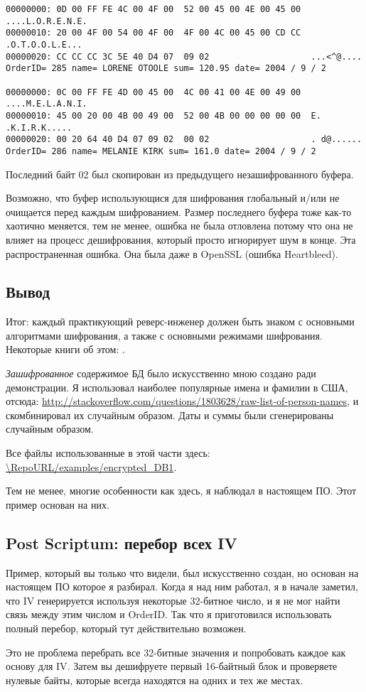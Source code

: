 \begin{lstlisting}
00000000: 0D 00 FF FE 4C 00 4F 00  52 00 45 00 4E 00 45 00  ....L.O.R.E.N.E.
00000010: 20 00 4F 00 54 00 4F 00  4F 00 4C 00 45 00 CD CC   .O.T.O.O.L.E...
00000020: CC CC CC 3C 5E 40 D4 07  09 02                    ...<^@....
OrderID= 285 name= LORENE OTOOLE sum= 120.95 date= 2004 / 9 / 2

00000000: 0C 00 FF FE 4D 00 45 00  4C 00 41 00 4E 00 49 00  ....M.E.L.A.N.I.
00000010: 45 00 20 00 4B 00 49 00  52 00 4B 00 00 00 00 00  E. .K.I.R.K.....
00000020: 00 20 64 40 D4 07 09 02  00 02                    . d@......
OrderID= 286 name= MELANIE KIRK sum= 161.0 date= 2004 / 9 / 2
\end{lstlisting}

Последний байт 02 был скопирован из предыдущего незашифрованного буфера.

Возможно, что буфер использующися для шифрования глобальный и/или не очищается перед каждым шифрованием.
Размер последнего буфера тоже как-то хаотично меняется, тем не менее, ошибка не была отловлена потому что она не влияет
на процесс дешифрования, который просто игнорирует шум в конце.
Эта распространенная ошибка.
Она была даже в OpenSSL (ошибка Heartbleed).

\subsection{Вывод}

Итог:
каждый практикующий реверс-инженер должен быть знаком с основными алгоритмами шифрования, а также с основными режимами
шифрования.
Некоторые книги об этом: .

\emph{Зашифрованное} содержимое БД было искусственно мною создано ради демонстрации.
Я использовал наиболее популярные имена и фамилии в США, отсюда: \url{http://stackoverflow.com/questions/1803628/raw-list-of-person-names},
и скомбинировал их случайным образом.
Даты и суммы были сгенерированы случайным образом.

Все файлы использованные в этой части здесь:
\url{\RepoURL/examples/encrypted_DB1}.

Тем не менее, многие особенности как здесь, я наблюдал в настоящем ПО.
Этот пример основан на них.

\subsection{Post Scriptum: перебор всех \ac{IV}}

Пример, который вы только что видели, был искусственно создан, но основан на настоящем ПО которое я разбирал.
Когда я над ним работал, я в начале заметил, что \ac{IV} генерируется используя некоторые 32-битное число,
и я не мог найти связь между этим числом и OrderID.
Так что я приготовился использовать полный перебор, который тут действительно возможен.

Это не проблема перебрать все 32-битные значения и попробовать каждое как основу для \ac{IV}.
Затем вы дешифруете первый 16-байтный блок и проверяете нулевые байты, которые всегда находятся на одних и тех же местах.
